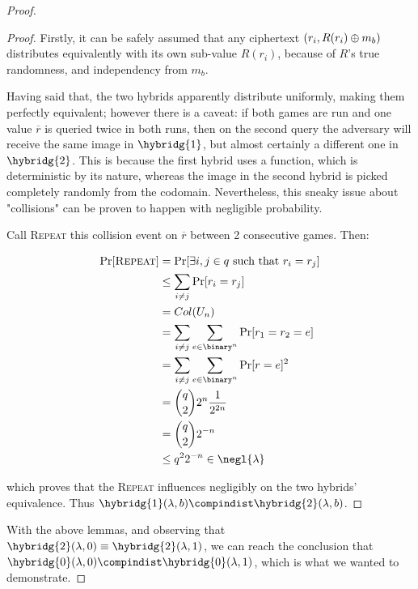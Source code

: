 \begin{proof}
    \begin{proof}
        Firstly, it can be safely assumed that any ciphertext $(r_i, R(r_i) \oplus m_b)$ distributes equivalently with its own sub-value $R(r_i)$, because of $R$'s true randomness, and independency from $m_b$.

        Having said that, the two hybrids apparently distribute uniformly, making them perfectly equivalent; however there is a caveat: if both games are run and one value $\overline{r}$ is queried twice in both runs, then on the second query the adversary will receive the same image in $\hybridg{1}$, but almost certainly a different one in $\hybridg{2}$. This is because the first hybrid uses a function, which is deterministic by its nature, whereas the image in the second hybrid is picked completely randomly from the codomain. Nevertheless, this sneaky issue about "collisions" can be proven to happen with negligible probability.

        Call \textsc{Repeat} this collision event on $\overline{r}$ between 2 consecutive games. Then:
        
        \begin{align*}
        \Pr[\textsc{Repeat}] &= \Pr[\exists i, j \in q \text{ such that } r_i = r_j] \\
            &\leq \sum_{i \neq j} \Pr[r_i=r_j] \\
            &= Col(U_n) \\
            &= \sum_{i \neq j} \sum_{e \in \binary^n} \Pr[r_1 = r_2 = e] \\
            &= \sum_{i \neq j} \sum_{e \in \binary^n} \Pr[r = e]^{2} \\
            &= \binom{q}{2} 2^{n} \frac{1}{2^{2n}} \\
            &= \binom{q}{2} 2^{-n} \\
            &\leq q^{2}2^{-n} \in \negl{\lambda} 
        \end{align*} 


        which proves that the \textsc{Repeat} influences negligibly on the two hybrids' equivalence. Thus $\hybridg{1}(\lambda, b) \compindist \hybridg{2}(\lambda, b)$\footnotemark.
        
    \end{proof}

    With the above lemmas, and observing that $\hybridg{2}(\lambda, 0) \equiv \hybridg{2}(\lambda, 1)$, we can reach the conclusion that $\hybridg{0}(\lambda, 0) \compindist \hybridg{0}(\lambda, 1)$, which is what we wanted to demonstrate.

\end{proof}
